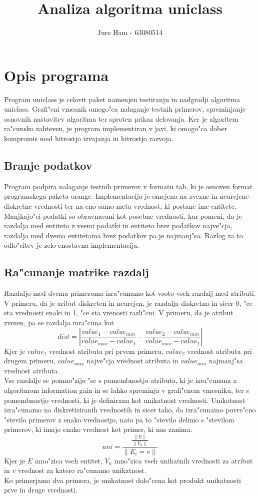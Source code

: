 \documentclass[a4paper]{article}
\title{Analiza algoritma uniclass}
\author{Jure Ham - 63080514}
\begin{document}
\pagebreak

\section{Opis programa}
	Program uniclass je celovit paket namenjen testiranju in nadgradji algoritma uniclass. Grafi"cni vmesnik omogo"ca nalaganje testnih primerov, spreminjanje osnovnih nastavitev algoritma ter sproten prikaz delovanja. Ker je algoritem ra"cunsko zahteven, je program implementiran v javi, ki omogo"ca dober kompromis med hitrostjo izvajanja in hitrostjo razvoja.

	\subsection{Branje podatkov}
		Program podpira nalaganje testnih primerov v formatu tab, ki je osnoven format programskega paketa orange. Implementacija je omejena na zvezne in neurejene diskretne vrednosti ter na eno samo meta vrednost, ki postane ime entitete. \\
		Manjkajo"ci podatki so obravnavani kot posebne vrednosti, kar pomeni, da je razdalja med entiteto z vsemi podatki in entiteto brez podatkov najve"cja, razdalja med dvema entitetama brez podatkov pa je najmanj"sa. Razlog za to odlo"citev je zelo enostavna implementacija.
	
	\subsection{Ra"cunanje matrike razdalj}
		Razdaljo med dvema primeroma izra"cunamo kot vsoto vseh razdalj med atributi. V primeru, da je aribut diskreten in neurejen, je razdalja diskretna in sicer 0, "ce sta vrednosti enaki in 1, "ce sta vrenosti razli"cni. V primeru, da je atribut zvezen, pa se razdalja inra"cuna kot $$ dist = \left|\frac{value_1 - value_{min}}{value_{max} - value_1} - \frac{value_2 - value_{min}}{value_{max} - value_2}\right| $$
		Kjer je $value_1$ vrednost atributa pri prvem primeru, $value_2$ vrednost atributa pri drugem primeru, $value_{max}$ najve"cja vrednost atributa in $value_{min}$ najmanj"sa vrednost atributa.\\
		Vse razdalje se pomno"zijo "se s pomembnostjo atributa, ki je izra"cunana z algoritmom information gain in se lahko spreminja v grafi"cnem vmesniku, ter s pomembnostjo vrednosti, ki je definirana kot unikatnost vrednosti. Unikatnost izra"cunamo na diskretiziranih vrednostih in sicer tako, da izra"cunamo povre"cno "stevilo primerov z enako vrednostjo, nato pa to "stevilo delimo s "stevilom primerov, ki imajo enako vrednost kot primer, ki nas zanima. 
		$$ uni = \frac{\frac{\parallel E \parallel}{\parallel V_u \parallel}}{\parallel E_i=v \parallel} $$
		Kjer je $E$ mno"zica vseh entitet, $V_u$ mno"zica vseh unikatnih vrednosti za atribut in $v$ vrednost za katero ra"cunamo unikatnost.\\
		Ko primerjamo dva primera, je unikatnost dolo"cena kot produkt unikatnosti prve in druge vrednosti.
		
\end{document}
